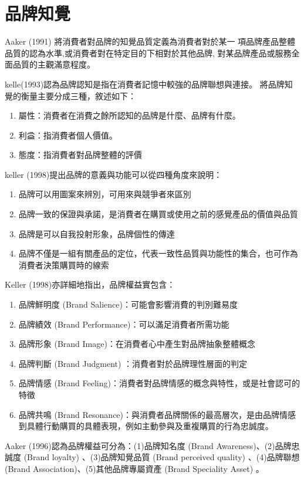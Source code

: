 \section{品牌知覺}
Aaker (1991) \cite{Aaker1991}將消費者對品牌的知覺品質定義為消費者對於某一 項品牌產品整體品質的認為水準,或消費者對在特定目的下相對於其他品牌, 對某品牌產品或服務全面品質的主觀滿意程度。

kelle(1993)\cite{Keller1993}認為品牌認知是指在消費者記憶中較強的品牌聯想與連接。
將品牌知覺的衡量主要分成三種，敘述如下：
\begin{enumerate}
\item 屬性：消費者在消費之餘所認知的品牌是什麼、品牌有什麼。
\item 利益：指消費者個人價值。
\item 態度：指消費者對品牌整體的評價
\end{enumerate}


keller (1998)\cite{Keller1998}提出品牌的意義與功能可以從四種角度來說明：
\begin{enumerate}
\item 品牌可以用圖案來辨別，可用來與競爭者來區別

\item 品牌一致的保證與承諾，是消費者在購買或使用之前的感覺產品的價值與品質

\item 品牌是可以自我投射形象，品牌個性的傳達

\item 品牌不僅是一組有關產品的定位，代表一致性品質與功能性的集合，也可作為消費者決策購買時的線索
\end{enumerate}
    Keller (1998)\cite{Keller1998}亦詳細地指出，品牌權益實包含：
\begin{enumerate}
\item 品牌鮮明度 (Brand Salience)：可能會影響消費的判別難易度
\item 品牌績效 (Brand Performance)：可以滿足消費者所需功能
\item 品牌形象 (Brand Image)：在消費者心中產生對品牌抽象整體概念
\item 品牌判斷 (Brand Judgment) ：消費者對於品牌理性層面的判定
\item 品牌情感 (Brand Feeling)：消費者對品牌情感的概念與特性，或是社會認可的特徵
\item 品牌共鳴 (Brand Resonance)：與消費者品牌關係的最高層次，是由品牌情感到具體行動購買的具體表現，例如主動參與及重複購買的行為忠誠度。
\end{enumerate}
Aaker (1996)\cite{Aaker1996}認為品牌權益可分為：(1)品牌知名度 (Brand Awareness)、(2)品牌忠誠度 (Brand loyalty) 、(3)品牌知覺品質 (Brand perceived quality) 、(4)品牌聯想 (Brand Association)、(5)其他品牌專屬資產 (Brand Speciality Asset) 。



